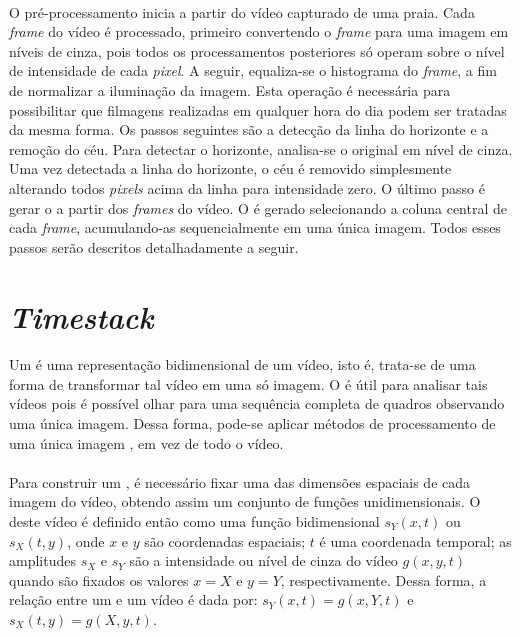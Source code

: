 \paragraph{}O pré-processamento inicia a partir do vídeo capturado de uma praia. Cada \textit{frame} do vídeo é processado, primeiro convertendo o \textit{frame} para uma imagem em níveis de cinza, pois todos os processamentos posteriores só operam sobre o nível de intensidade de cada \textit{pixel}. A seguir, equaliza-se o histograma do \textit{frame}, a fim de normalizar a iluminação da imagem. Esta operação é necessária para possibilitar que filmagens realizadas em qualquer hora do dia podem ser tratadas da mesma forma. Os passos seguintes são a detecção da linha do horizonte e a remoção do céu. Para detectar o horizonte, analisa-se o \frame original em nível de cinza. Uma vez detectada a linha do horizonte, o céu é removido simplesmente alterando todos \textit{pixels} acima da linha para intensidade zero. O último passo é gerar o \timestack a partir dos \textit{frames} do vídeo. O \timestack é gerado selecionando a coluna central de cada \textit{frame}, acumulando-as sequencialmente em uma única imagem. Todos esses passos serão descritos detalhadamente a seguir.

\section{\textit{Timestack}}

\paragraph{}Um \timestack é uma representação bidimensional de um vídeo, isto é, trata-se de uma forma de transformar tal vídeo em uma só imagem. O \timestack é útil para analisar tais vídeos pois é possível olhar para uma sequência completa de quadros observando uma única imagem. Dessa forma, pode-se aplicar métodos de processamento de uma única imagem \timestack, em vez de todo o vídeo.

\paragraph{}Para construir um \timestack, é necessário fixar uma das dimensões espaciais de cada imagem do vídeo, obtendo assim um conjunto de funções unidimensionais. O \timestack deste vídeo é definido então como uma função bidimensional \(s_{Y}(x,t)\) ou \(s_{X}(t,y)\), onde \(x\) e \(y\) são coordenadas espaciais; \(t\) é uma coordenada temporal; as amplitudes \(s_{X}\) e \(s_{Y}\) são a intensidade ou nível de cinza do vídeo \(g(x,y,t)\) quando são fixados os valores \(x = X\) e \(y = Y\), respectivamente. Dessa forma, a relação entre um \timestack e um vídeo é dada por: \(s_{Y}(x,t)=g(x,Y,t)\) e \(s_{X}(t,y) = g(X,y,t)\).

